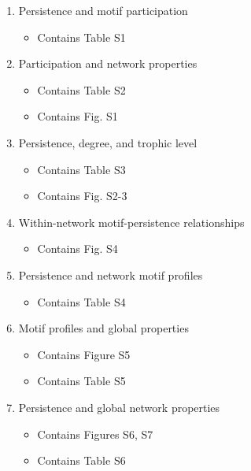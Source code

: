 \documentclass[12pt]{article}
\begin{document}
\begin{spacing}{2.0}
\begin{spacing}{1.0}
\begin{enumerate}
        \item Persistence and motif participation
            \begin{itemize}
                \item Contains Table S1
            \end{itemize}


        \item Participation and network properties

            \begin{itemize}
                \item Contains Table S2
                \item Contains Fig. S1
            \end{itemize}
    
        \item Persistence, degree, and trophic level

            \begin{itemize}
                \item Contains Table S3
                \item Contains Fig. S2-3
            \end{itemize}    

        \item Within-network motif-persistence relationships

            \begin{itemize}
                \item Contains Fig. S4
            \end{itemize}    
    
        \item Persistence and network motif profiles

            \begin{itemize}
                \item Contains Table S4
            \end{itemize}   
        
        \item Motif profiles and global properties

            \begin{itemize}
                \item Contains Figure S5
                \item Contains Table S5
            \end{itemize}

        \item Persistence and global network properties
            \begin{itemize}
                \item Contains Figures S6, S7
                \item Contains Table S6
            \end{itemize}


\end{enumerate}
\end{spacing}
\end{spacing}
\end{document}
